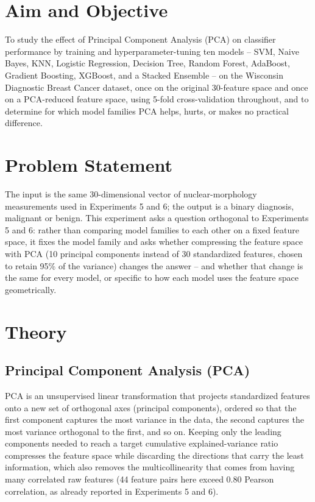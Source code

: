 \documentclass[11pt,a4paper]{article}
\begin{document}
\section{Aim and Objective}
To study the effect of Principal Component Analysis (PCA) on classifier performance by training and hyperparameter-tuning ten models -- SVM, Naive Bayes, KNN, Logistic Regression, Decision Tree, Random Forest, AdaBoost, Gradient Boosting, XGBoost, and a Stacked Ensemble -- on the Wisconsin Diagnostic Breast Cancer dataset, once on the original 30-feature space and once on a PCA-reduced feature space, using 5-fold cross-validation throughout, and to determine for which model families PCA helps, hurts, or makes no practical difference.

\section{Problem Statement}
The input is the same 30-dimensional vector of nuclear-morphology measurements used in Experiments 5 and 6; the output is a binary diagnosis, malignant or benign. This experiment asks a question orthogonal to Experiments 5 and 6: rather than comparing model families to each other on a fixed feature space, it fixes the model family and asks whether compressing the feature space with PCA (10 principal components instead of 30 standardized features, chosen to retain 95\% of the variance) changes the answer -- and whether that change is the same for every model, or specific to how each model uses the feature space geometrically.

\section{Theory}

\subsection{Principal Component Analysis (PCA)}
PCA is an unsupervised linear transformation that projects standardized features onto a new set of orthogonal axes (principal components), ordered so that the first component captures the most variance in the data, the second captures the most variance orthogonal to the first, and so on. Keeping only the leading components needed to reach a target cumulative explained-variance ratio compresses the feature space while discarding the directions that carry the least information, which also removes the multicollinearity that comes from having many correlated raw features (44 feature pairs here exceed 0.80 Pearson correlation, as already reported in Experiments 5 and 6).
\end{document}
